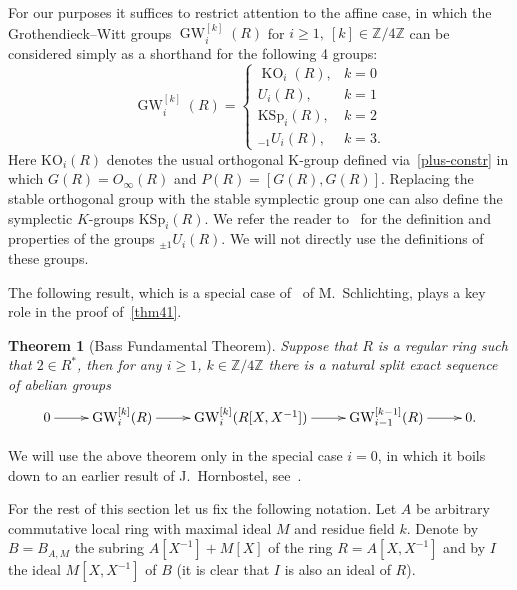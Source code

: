 \documentclass[oneside, 8pt]{amsart}
\newtheorem{externaltheorem}[lemma]{Theorem}
\theoremstyle{remark}
\theoremstyle{definition}
\numberwithin{lemma}{section}
\numberwithin{prop}{section}
\numberwithin{corollary}{section}
\numberwithin{externaltheorem}{section}
\DeclareMathOperator{\KO}{KO}
\DeclareMathOperator{\GW}{GW}
\newcommand{\ZZ}{\mathbb{Z}}
\numberwithin{equation}{section}
\begin{document}
For our purposes it suffices to restrict attention to the affine case, in which  the Grothendieck--Witt groups $\GW_i^{[k]}(R)$ for $i \geq 1,\ [k] \in \ZZ/4\ZZ$ can be considered simply as a shorthand for the following 4 groups:
\begin{equation*} \GW_i^{[k]}(R) = \left\{\begin{array}{ll} \KO_i(R), & k = 0 \\ U_i(R), & k = 1 \\ \mathrm{KSp}_i(R), & k = 2 \\ {}_{-1}\!U_i(R), & k = 3. \end{array}\right. \end{equation*}
Here $\mathrm{KO}_i(R)$ denotes the usual orthogonal K-group defined via~\eqref{plus-constr} in which $G(R) = O_\infty(R)$ and $P(R) = [G(R), G(R)]$.
Replacing the stable orthogonal group with the stable symplectic group one can also define the symplectic $K$-groups $\mathrm{KSp}_i(R)$.
We refer the reader to~\cite{Ka80} for the definition and properties of the groups ${}_{\pm 1}\!U_i(R)$.
We will not directly use the definitions of these groups.

The following result, which is a special case of~\cite[Theorem~9.13]{Sch16} of M.~Schlichting, plays a key role in the proof of~\cref{thm41}.
\begin{externaltheorem}[Bass Fundamental Theorem]\label{bass-ft} Suppose that $R$ is a regular ring such that $2 \in R^*$, 
then for any $i\geq 1$, $k\in \ZZ/4\ZZ$ there is a natural split exact sequence of abelian groups \[ \xymatrix{ 0 \ar[r] & \GW_i^{[k]}(R) \ar[r] & \GW_i^{[k]}(R[X, X^{-1}]) \ar[r]  & \GW_{i-1}^{[k-1]}(R) \ar[r] & 0.} \] \end{externaltheorem}
We will use the above theorem only in the special case $i=0$, in which it boils down to an earlier result of J.~Hornbostel, see~\cite[Corollary~5.3]{Ho05}.

For the rest of this section let us fix the following notation.
Let $A$ be arbitrary commutative local ring with maximal ideal $M$ and residue field $k$.
Denote by $B = B_{A, M}$ the subring $A[X^{-1}] + M[X]$ of the ring $R = A[X, X^{-1}]$ and
by $I$ the ideal $M[X, X^{-1}]$ of $B$ (it is clear that $I$ is also an ideal of $R$).
\end{document}
